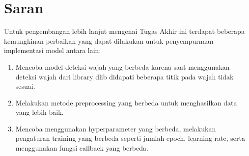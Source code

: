 



\section{Saran}
\label{chap:saran}

Untuk pengembangan lebih lanjut mengenai Tugas Akhir ini terdapat beberapa
kemungkinan perbaikan yang dapat dilakukan untuk penyempurnaan implementasi
model antara lain:

\begin{enumerate}[nolistsep]

      \item Mencoba model deteksi wajah yang berbeda karena saat menggunakan deteksi wajah dari library dlib
            didapati beberapa titik pada wajah tidak sesuai.

      \item Melakukan metode preprocessing yang berbeda untuk menghasilkan data yang lebih baik.

      \item Mencoba menggunakan hyperparameter yang berbeda, melakukan pengaturan training yang berbeda seperti
            jumlah epoch, learning rate, serta menggunakan fungsi callback yang berbeda.

\end{enumerate}
